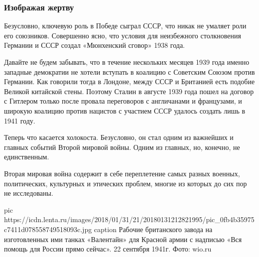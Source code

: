 
 
 
 
 

\subsubsection{Изображая жертву}


Безусловно, ключевую роль в Победе сыграл СССР, что никак не умаляет роли его
союзников. Совершенно ясно, что условия для неизбежного столкновения Германии и
СССР создал «Мюнхенский сговор» 1938 года.

Давайте не будем забывать, что в течение нескольких месяцев 1939 года именно
западные демократии не хотели вступать в коалицию с Советским Союзом против
Германии. Как говорили тогда в Лондоне, между СССР и Британией есть подобие
Великой китайской стены. Поэтому Сталин в августе 1939 года пошел на договор с
Гитлером только после провала переговоров с англичанами и французами, и широкую
коалицию против нацистов с участием СССР удалось создать лишь в 1941 году.

Теперь что касается холокоста. Безусловно, он стал одним из важнейших и главных
событий Второй мировой войны. Одним из главных, но, конечно, не единственным.

Вторая мировая война содержит в себе переплетение самых разных военных,
политических, культурных и этических проблем, многие из которых до сих пор не
исследованы.

\ifcmt
pic https://icdn.lenta.ru/images/2018/01/31/21/20180131212821995/pic_0fb4b35975c7411d078558749518093c.jpg
caption Рабочие британского завода на изготовленных ими танках «Валентайн» для Красной армии с надписью «Вся помощь для России прямо сейчас». 22 сентября 1941г.  Фото: wio.ru
\fi

